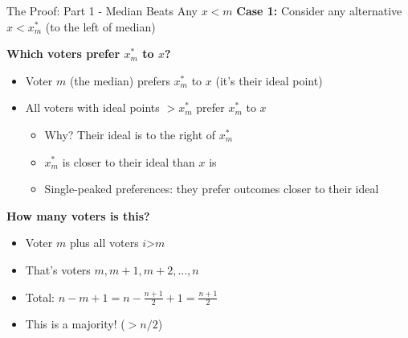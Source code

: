 \documentclass[10pt]{beamer}
\begin{document}
\begin{frame}{The Proof: Part 1 - Median Beats Any $x < m$}
\textbf{Case 1:} Consider any alternative $x < x_m^*$ (to the left of median)



\textbf{Which voters prefer $x_m^*$ to $x$?}
\begin{itemize}
\item Voter $m$ (the median) prefers $x_m^*$ to $x$ (it's their ideal point)
\item All voters with ideal points $> x_m^*$ prefer $x_m^*$ to $x$
\begin{itemize}
\item Why? Their ideal is to the right of $x_m^*$
\item $x_m^*$ is closer to their ideal than $x$ is
\item Single-peaked preferences: they prefer outcomes closer to their ideal
\end{itemize}
\end{itemize}



\textbf{How many voters is this?}
\begin{itemize}
\item Voter $m$ plus all voters $i $>$ m$
\item That's voters $m, m+1, m+2, \ldots, n$
\item Total: $n - m + 1 = n - \frac{n+1}{2} + 1 = \frac{n+1}{2}$
\item \alert{This is a majority!} ($> n/2$)
\end{itemize}
\end{frame}
\end{document}
